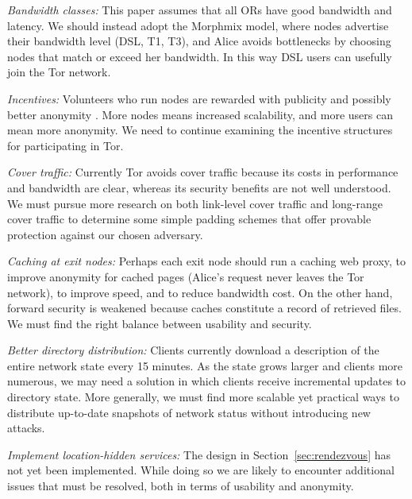 \documentclass[times,10pt,twocolumn]{article}
\begin{document}
\emph{Bandwidth classes:} This paper assumes that all ORs have
good bandwidth and latency. We should instead adopt the Morphmix model,
where nodes advertise their bandwidth level (DSL, T1, T3), and
Alice avoids bottlenecks by choosing nodes that match or
exceed her bandwidth. In this way DSL users can usefully join the Tor
network.

\emph{Incentives:} Volunteers who run nodes are rewarded with publicity
and possibly better anonymity \cite{econymics}. More nodes means increased
scalability, and more users can mean more anonymity. We need to continue
examining the incentive structures for participating in Tor.

\emph{Cover traffic:} Currently Tor avoids cover traffic because its costs
in performance and bandwidth are clear, whereas its security benefits are
not well understood. We must pursue more research on both link-level cover
traffic and long-range cover traffic to determine some simple padding
schemes that offer provable protection against our chosen adversary.


\emph{Caching at exit nodes:} Perhaps each exit node should run a
caching web proxy, to improve anonymity for cached pages (Alice's request never
leaves the Tor network), to improve speed, and to reduce bandwidth cost.
On the other hand, forward security is weakened because caches
constitute a record of retrieved files.  We must find the right
balance between usability and security.

\emph{Better directory distribution:} %
Clients currently download a description of
the entire network state every 15 minutes. As the state grows larger
and clients more numerous, we may need a solution in which
clients receive incremental updates to directory state.
More generally, we must find more
scalable yet practical ways to distribute up-to-date snapshots of
network status without introducing new attacks.

\emph{Implement location-hidden services:} The design in
Section~\ref{sec:rendezvous} has not yet been implemented.  While doing
so we are likely to encounter additional issues that must be resolved,
both in terms of usability and anonymity.
\end{document}
